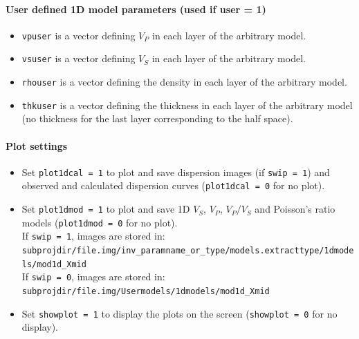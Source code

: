 \documentclass[twoside,a4paper]{article}
\begin{document}
\paragraph{User defined 1D model parameters (used if user = 1)}
\begin{itemize}[leftmargin=*]
\setlength\itemsep{2ex}
\item \verb|vpuser| is a vector defining $V_P$ in each layer of the arbitrary model.
\item \verb|vsuser| is a vector defining $V_S$ in each layer of the arbitrary model.
\item \verb|rhouser| is a vector defining the density in each layer of the arbitrary model.
\item \verb|thkuser| is a vector defining the thickness in each layer of the arbitrary model (no thickness for the last layer corresponding to the half space).
\end{itemize}

\paragraph{Plot settings}
\begin{itemize}[leftmargin=*]
\setlength\itemsep{2ex}
\item Set \verb|plot1dcal = 1| to plot and save dispersion images (if \verb|swip = 1|) and observed and calculated dispersion curves (\verb|plot1dcal = 0| for no plot).

\item Set \verb|plot1dmod = 1| to plot and save 1D $V_S$, $V_P$, $V_P/V_S$ and Poisson's ratio models (\verb|plot1dmod = 0| for no plot).\\[1ex]
If \verb|swip = 1|, images are stored in:\\
\verb|subprojdir/file.img/inv_paramname_or_type/models.extracttype/1dmodels/mod1d_Xmid|\\[1ex]
If \verb|swip = 0|, images are stored in:\\
\verb|subprojdir/file.img/Usermodels/1dmodels/mod1d_Xmid|

\item Set \verb|showplot = 1| to display the plots on the screen (\verb|showplot = 0| for no display).
\end{itemize}
\end{document}

